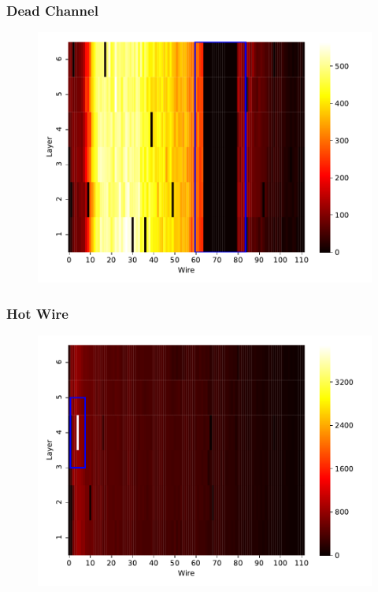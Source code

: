 \begin{frame}
  \frametitle{Dead Channel}
  \begin{figure}
    \includegraphics[width=.85\textwidth]{../figures/dead_channel}
  \end{figure}
\end{frame}

\begin{frame}
  \frametitle{Hot Wire}
  \begin{figure}
    \includegraphics[width=.85\textwidth]{../figures/hot_wire}
  \end{figure}
\end{frame}
